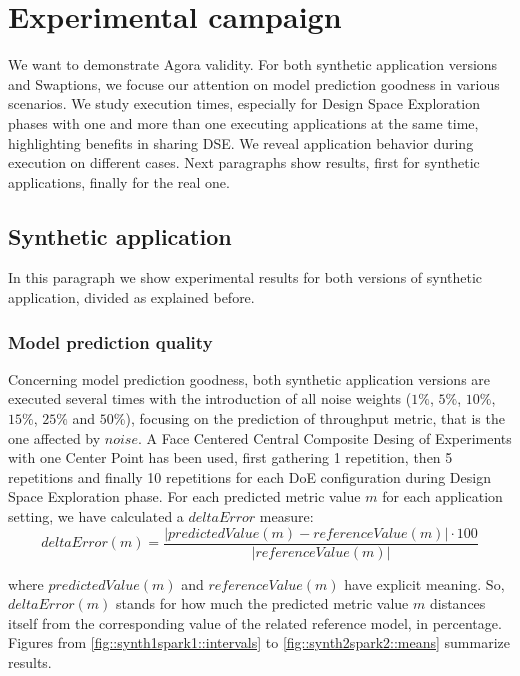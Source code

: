 \section{Experimental campaign}\label{campaign}

We want to demonstrate Agora validity. For both synthetic application versions and Swaptions, we focuse our attention on model prediction goodness in various scenarios. We study execution times, especially for Design Space Exploration phases with one and more than one executing applications at the same time, highlighting benefits in sharing DSE. We reveal application behavior during execution on different cases. Next paragraphs show results, first for synthetic applications, finally for the real one.


\subsection{Synthetic application}

In this paragraph we show experimental results for both versions of synthetic application, divided as explained before.


\subsubsection{Model prediction quality}\label{deltaErrorExplanation}

Concerning model prediction goodness, both synthetic application versions are executed several times with the introduction of all noise weights ($1\%$, $5\%$, $10\%$, $15\%$, $25\%$ and $50\%$), focusing on the prediction of throughput metric, that is the one affected by $noise$. A Face Centered Central Composite Desing of Experiments with one Center Point has been used, first gathering 1 repetition, then 5 repetitions and finally 10 repetitions for each DoE configuration during Design Space Exploration phase. For each predicted metric value $m$ for each application setting, we have calculated a $deltaError$ measure:
\[
deltaError(m) = \dfrac{\left\vert predictedValue(m) - referenceValue(m) \right\vert \cdot 100}{\left\vert referenceValue(m) \right\vert}
\]

where $predictedValue(m)$ and $referenceValue(m)$ have explicit meaning. So, $deltaError(m)$ stands for how much the predicted metric value $m$ distances itself from the corresponding value of the related reference model, in percentage. Figures from \ref{fig::synth1spark1::intervals} to \ref{fig::synth2spark2::means} summarize results.





